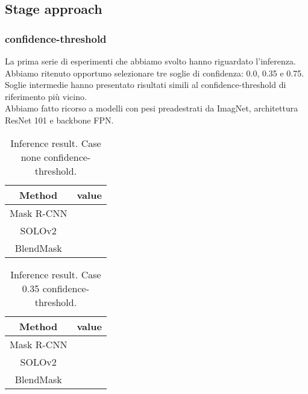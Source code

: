 \documentclass[10pt,twocolumn,letterpaper]{article}
\begin{document}
\subsection{Stage approach}
\subsubsection{confidence-threshold}
La prima serie di esperimenti che abbiamo svolto hanno riguardato l'inferenza. Abbiamo ritenuto opportuno selezionare tre soglie di confidenza: 0.0, 0.35 e 0.75. Soglie intermedie hanno presentato risultati simili al confidence-threshold di riferimento pi\`u vicino.\\
Abbiamo fatto ricorso a modelli con pesi preadestrati da ImagNet, architettura ResNet 101 e backbone FPN.
\begin{table}[H]
\scriptsize
\begin{center}
\begin{tabular}{|c|c|}
\hline
Method & value \\
\hline\hline
Mask R-CNN &  \\
\hline
SOLOv2 & \\
\hline
BlendMask & \\
\hline
\end{tabular}
\end{center}
\caption{Inference result. Case none confidence-threshold.}
\label{mytable_inferencenone}
\end{table} 

\begin{table}[H]
\scriptsize
\begin{center}
\begin{tabular}{|c|c|}
\hline
Method & value \\
\hline\hline
Mask R-CNN & \\
\hline
SOLOv2 & \\
\hline
BlendMask & \\
\hline
\end{tabular}
\end{center}
\caption{Inference result. Case 0.35 confidence-threshold.}
\label{mytable_inference0.35}
\end{table}
\end{document}
